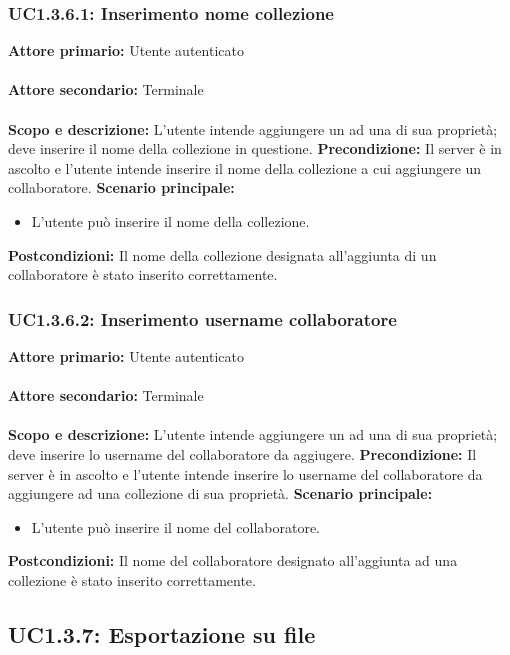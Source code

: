 \documentclass{scalatekids-article}
\begin{document}
\subsubsection{UC1.3.6.1: Inserimento nome collezione}

\textbf{Attore primario:} Utente autenticato\\ \\
\textbf{Attore secondario:} Terminale\\ \\
\textbf{Scopo e descrizione:} L'utente intende aggiungere un  ad una  di sua proprietà; deve inserire il nome della collezione in questione.
\textbf{Precondizione:} Il server è in ascolto e l'utente intende inserire il nome della collezione a cui aggiungere un collaboratore.
\textbf{Scenario principale:}
\begin{itemize}
\item L'utente può inserire il nome della collezione.
\end{itemize}
\textbf{Postcondizioni:} Il nome della collezione designata all'aggiunta di un collaboratore è stato inserito correttamente.

\subsubsection{UC1.3.6.2: Inserimento username collaboratore}

\textbf{Attore primario:} Utente autenticato\\ \\
\textbf{Attore secondario:} Terminale\\ \\
\textbf{Scopo e descrizione:} L'utente intende aggiungere un  ad una  di sua proprietà; deve inserire lo username del collaboratore da aggiugere.
\textbf{Precondizione:} Il server è in ascolto e l'utente intende inserire lo username del collaboratore da aggiungere ad una collezione di sua proprietà.
\textbf{Scenario principale:}
\begin{itemize}
\item L'utente può inserire il nome del collaboratore.
\end{itemize}
\textbf{Postcondizioni:} Il nome del collaboratore designato all'aggiunta ad una collezione è stato inserito correttamente.

\subsection{UC1.3.7: Esportazione su file}
\end{document}
